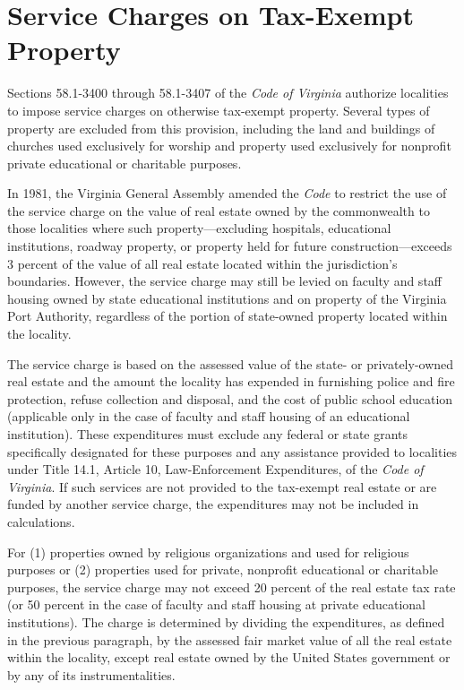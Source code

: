 \documentclass[
]{book}
\begin{document}
\hypertarget{service-charges-on-tax-exempt-property}{%
\chapter{Service Charges on Tax-Exempt Property}\label{service-charges-on-tax-exempt-property}}

Sections 58.1-3400 through 58.1-3407 of the \emph{Code of Virginia} authorize localities to impose service charges on otherwise tax-exempt property. Several types of property are excluded from this provision, including the land and buildings of churches used exclusively for worship and property used exclusively for nonprofit private educational or charitable purposes.

In 1981, the Virginia General Assembly amended the \emph{Code} to restrict the use of the service charge on the value of real estate owned by the commonwealth to those localities where such property---excluding hospitals, educational institutions, roadway property, or property held for future construction---exceeds 3 percent of the value of all real estate located within the jurisdiction's boundaries. However, the service charge may still be levied on faculty and staff housing owned by state educational institutions and on property of the Virginia Port Authority, regardless of the portion of state-owned property located within the locality.

The service charge is based on the assessed value of the state- or privately-owned real estate and the amount the locality has expended in furnishing police and fire protection, refuse collection and disposal, and the cost of public school education (applicable only in the case of faculty and staff housing of an educational institution). These expenditures must exclude any federal or state grants specifically designated for these purposes and any assistance provided to localities under Title 14.1, Article 10, Law-Enforcement Expenditures, of the \emph{Code of Virginia}. If such services are not provided to the tax-exempt real estate or are funded by another service charge, the expenditures may not be included in calculations.

For (1) properties owned by religious organizations and used for religious purposes or (2) properties used for private, nonprofit educational or charitable purposes, the service charge may not exceed 20 percent of the real estate tax rate (or 50 percent in the case of faculty and staff housing at private educational institutions). The charge is determined by dividing the expenditures, as defined in the previous paragraph, by the assessed fair market value of all the real estate within the locality, except real estate owned by the United States government or by any of its instrumentalities.
\end{document}
